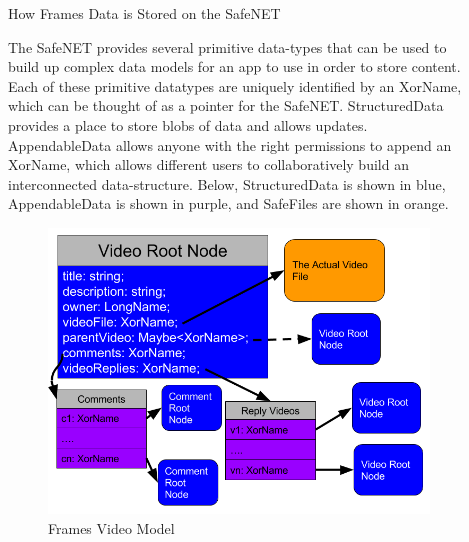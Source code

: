 \documentclass[final]{beamer}
\newlength{\sepwid}
\newlength{\onecolwid}
\newlength{\twocolwid}
\begin{document}
\begin{frame}[t]
\begin{columns}[t]
\begin{column}{\onecolwid}

\end{column} %

\begin{column}{\sepwid}\end{column} %

\begin{column}{\twocolwid} %

\begin{columns}[t,totalwidth=\twocolwid] %

\begin{column}{\onecolwid}\vspace{-.6in} %


\begin{block}{How Frames Data is Stored on the SafeNET}

  The SafeNET provides several primitive data-types that can be used
  to build up complex data models for an app to use in order to store
  content. Each of these primitive datatypes are uniquely identified by
  an XorName, which can be thought of as a pointer for the SafeNET.
  StructuredData provides a place to store blobs of data and
  allows updates. AppendableData allows anyone with the right permissions
  to append an XorName, which allows different users to collaboratively
  build an interconnected data-structure. Below, StructuredData is shown
  in blue, AppendableData is shown in purple, and SafeFiles are shown in
  orange.

  \begin{figure}
  \includegraphics[width=0.8\linewidth]{video-model.png}
  \caption{Frames Video Model}
  \label{fig:video-model}
  \end{figure}


\end{block}
\end{column}
\end{columns}
\end{column}
\end{columns}
\end{frame}
\end{document}
